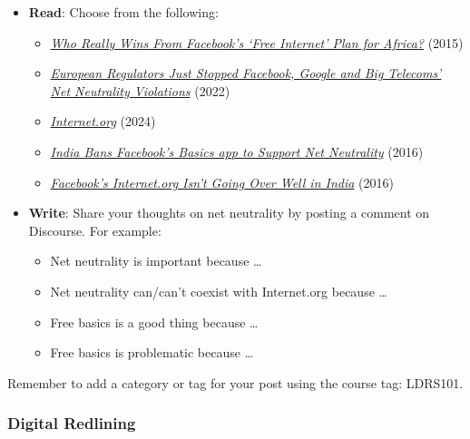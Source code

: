 \documentclass[
  letterpaper,
  DIV=11,
  numbers=noendperiod]{scrreprt}
\providecommand{\tightlist}{%
  \setlength{\itemsep}{0pt}\setlength{\parskip}{0pt}}\usepackage{longtable,booktabs,array}
\begin{document}
\begin{tcolorbox}
\begin{itemize}
\tightlist
\item
  \textbf{Read}: Choose from the following:

  \begin{itemize}
  \tightlist
  \item
    \href{https://www.zdnet.com/article/who-really-wins-from-facebooks-free-internet-plan-for-africa/}{\emph{Who
    Really Wins From Facebook's `Free Internet' Plan for Africa?}}
    (2015)
  \item
    \emph{\href{https://cyberlaw.stanford.edu/blog/2022/06/european-regulators-just-stopped-facebook-google-and-big-telecoms-net-neutrality}{European
    Regulators Just Stopped Facebook, Google and Big Telecoms' Net
    Neutrality Violations}} (2022)
  \item
    \emph{\href{https://en.wikipedia.org/wiki/Internet.org}{Internet.org}}
    (2024)
  \item
    \emph{\href{https://www.wired.com/2016/02/facebooks-free-basics-app-is-now-banned-in-india/}{India
    Bans Facebook's Basics app to Support Net Neutrality}} (2016)
  \item
    \href{https://fortune.com/2016/01/22/facebook-india-internet/}{\emph{Facebook's
    Internet.org Isn't Going Over Well in India}} (2016)
  \end{itemize}
\item
  \textbf{Write}: Share your thoughts on net neutrality by posting a
  comment on Discourse. For example:

  \begin{itemize}
  \tightlist
  \item
    Net neutrality is important because \ldots{}
  \item
    Net neutrality can/can't coexist with Internet.org because \ldots{}
  \item
    Free basics is a good thing because \ldots{}
  \item
    Free basics is problematic because \ldots{}
  \end{itemize}
\end{itemize}

Remember to add a category or tag for your post using the course tag:
LDRS101.

\end{tcolorbox}

\subsubsection{Digital Redlining}\label{digital-redlining}
\end{document}
